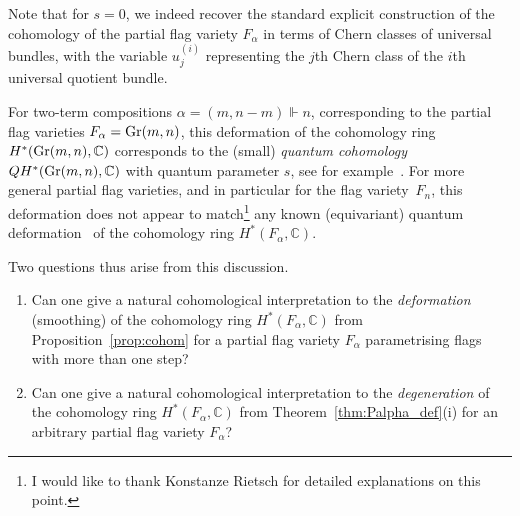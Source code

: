 \documentclass[a4paper,11pt]{amsart}
\theoremstyle{plain}
\theoremstyle{definition}
\newcommand{\C}{\mathbb{C}}
\begin{document}
Note that for $s=0$, we indeed recover the standard explicit construction of the cohomology of the partial flag variety $F_\alpha$ in terms of Chern classes of universal bundles, with the variable $u_j^{(i)}$ representing the $j$th Chern class of the $i$th universal quotient bundle. 

For two-term compositions $\alpha=(m,n-m)\Vdash n$, corresponding to the partial flag varieties $F_\alpha={\rm Gr}(m,n)$, this deformation 
of the cohomology ring $H^*({\rm Gr}(m,n), \C)$ corresponds to the (small) {\em quantum cohomology} $QH^*({\rm Gr}(m,n), \C)$ with quantum 
parameter $s$, see for example~\cite[Thm.0.1]{ST}. For more general partial flag varieties, and in particular for the flag variety~$F_n$, this deformation does not appear to match\footnote{I would like to thank Konstanze Rietsch for detailed explanations on this point.} any known 
(equivariant) quantum deformation~\cite{GK, CF, Kim}
of the cohomology ring $H^*(F_\alpha, \C)$. 

Two questions thus arise from this discussion. 
\begin{enumerate}
\item Can one give a natural cohomological interpretation to the {\em deformation} (smoothing) of the cohomology ring  $H^*(F_\alpha, \C)$ from Proposition~\ref{prop:cohom} for a partial flag variety $F_\alpha$ parametrising flags with more than one step?
\item Can one give a natural cohomological interpretation to the {\em degeneration} of the cohomology ring $H^*(F_\alpha, \C)$ from Theorem~\ref{thm:Palpha_def}(i) for an arbitrary partial flag variety $F_\alpha$? 
\end{enumerate}
\end{document}

